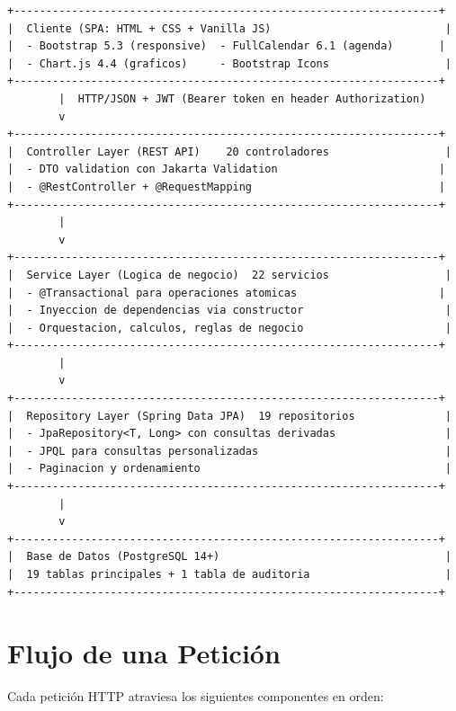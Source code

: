 \begin{verbatim}
+------------------------------------------------------------------+
|  Cliente (SPA: HTML + CSS + Vanilla JS)                           |
|  - Bootstrap 5.3 (responsive)  - FullCalendar 6.1 (agenda)       |
|  - Chart.js 4.4 (graficos)     - Bootstrap Icons                  |
+------------------------------------------------------------------+
        |  HTTP/JSON + JWT (Bearer token en header Authorization)
        v
+------------------------------------------------------------------+
|  Controller Layer (REST API)    20 controladores                  |
|  - DTO validation con Jakarta Validation                         |
|  - @RestController + @RequestMapping                             |
+------------------------------------------------------------------+
        |
        v
+------------------------------------------------------------------+
|  Service Layer (Logica de negocio)  22 servicios                  |
|  - @Transactional para operaciones atomicas                      |
|  - Inyeccion de dependencias via constructor                      |
|  - Orquestacion, calculos, reglas de negocio                      |
+------------------------------------------------------------------+
        |
        v
+------------------------------------------------------------------+
|  Repository Layer (Spring Data JPA)  19 repositorios              |
|  - JpaRepository<T, Long> con consultas derivadas                 |
|  - JPQL para consultas personalizadas                             |
|  - Paginacion y ordenamiento                                      |
+------------------------------------------------------------------+
        |
        v
+------------------------------------------------------------------+
|  Base de Datos (PostgreSQL 14+)                                   |
|  19 tablas principales + 1 tabla de auditoria                     |
+------------------------------------------------------------------+
\end{verbatim}

\section{Flujo de una Petici\'on}

Cada petici\'on HTTP atraviesa los siguientes componentes en orden:

